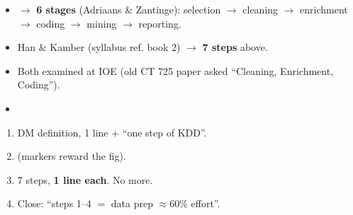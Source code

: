 \vspace{2pt}
\lead{\textcolor{mkc}{Conflict in your sources} \added}
\begin{itemize}
  \item {} $\rightarrow$ \textbf{6 stages} (Adriaans \& Zantinge):
        selection $\rightarrow$ cleaning $\rightarrow$ enrichment $\rightarrow$ coding $\rightarrow$ mining $\rightarrow$ reporting.
  \item Han \& Kamber (syllabus ref. book 2) $\rightarrow$ \textbf{7 steps} above.
  \item Both examined at IOE (old CT 725 paper asked ``Cleaning, Enrichment, Coding'').
  \item {}
\end{itemize}

\begin{enumerate}
  \item DM definition, 1 line $+$ ``one step of KDD''.
  \item {} (markers reward the fig).
  \item 7 steps, \textbf{1 line each}. No more.
  \item Close: ``steps 1--4 $=$ data prep $\approx$60\% effort''.
\end{enumerate}


